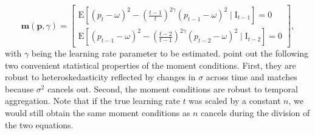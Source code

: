 \documentclass[webpdf,modern,medium]{oup-authoring-template}
\newcommand{\bs}{\boldsymbol}
\theoremstyle{thmstyleone}%
\theoremstyle{thmstyletwo}%
\theoremstyle{thmstylethree}%
\begin{document}
        \begin{equation}
            \bs{m}\left(\bs{p}, \gamma \right) = \left[\begin{array}{c}
            \mathrm{E}\left[\left(p_t - \omega\right)^2 - \left(\frac{t - 1}{t}\right)^{2 \gamma}\left(p_{t - 1} - \omega\right)^2 \mid \mathrm{I}_{t - 1}\right] = 0 \\
            \mathrm{E}\left[\left(p_{t - 1} - \omega\right)^2 - \left(\frac{t - 2}{t - 1}\right)^{2 \gamma}\left(p_{t - 2} - \omega\right)^2  \mid \mathrm{I}_{t - 2}\right] = 0
            \end{array}\right],
        \label{eq:moment_conditions}
        \end{equation}
        with $\gamma$ being the learning rate parameter to be estimated.
        \citet{biais1999} point out the following two convenient statistical properties of the moment conditions. First, they are robust to heteroskedasticity reflected by changes in $\sigma$ across time and matches because $\sigma^2$ cancels out. Second, the moment conditions are robust to temporal aggregation.
        Note that if the true learning rate $t$ was scaled by a constant $n$, we would still obtain the same moment conditions as $n$ cancels during the division of the two equations.
\end{document}
